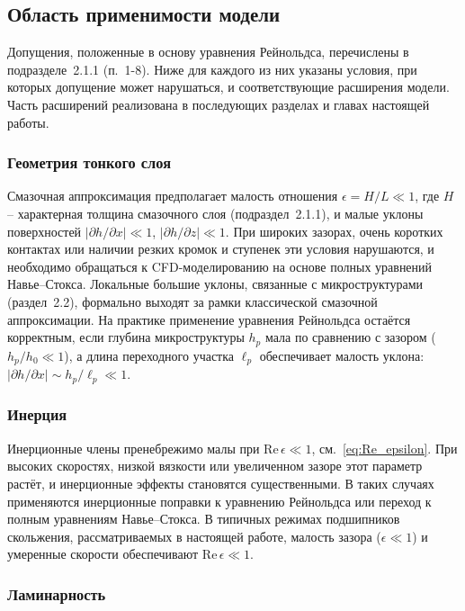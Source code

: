 \subsection{Область применимости модели}

Допущения, положенные в основу уравнения Рейнольдса, перечислены в подразделе~2.1.1 (п.~1-8). Ниже для каждого из них указаны условия, при которых допущение может нарушаться, и соответствующие расширения модели. Часть расширений реализована в последующих разделах и главах настоящей работы.

\subsubsection*{Геометрия тонкого слоя}

Смазочная аппроксимация предполагает малость отношения $\epsilon = H/L \ll 1$, где $H$ -- характерная толщина смазочного слоя (подраздел~2.1.1), и малые уклоны поверхностей $|\partial h/\partial x| \ll 1$, $|\partial h/\partial z| \ll 1$. При широких зазорах, очень коротких контактах или наличии резких кромок и ступенек эти условия нарушаются, и необходимо обращаться к CFD-моделированию на основе полных уравнений Навье--Стокса. Локальные большие уклоны, связанные с микроструктурами (раздел~2.2), формально выходят за рамки классической смазочной аппроксимации. На практике применение уравнения Рейнольдса остаётся корректным, если глубина микроструктуры $h_p$ мала по сравнению с зазором ($h_p / h_0 \ll 1$), а длина переходного участка $\ell_p$ обеспечивает малость уклона: $|\partial h/\partial x| \sim h_p/\ell_p \ll 1$.

\subsubsection*{Инерция}

Инерционные члены пренебрежимо малы при $\mathrm{Re}\,\epsilon \ll 1$, см.~\eqref{eq:Re_epsilon}. При высоких скоростях, низкой вязкости или увеличенном зазоре этот параметр растёт, и инерционные эффекты становятся существенными. В таких случаях применяются инерционные поправки к уравнению Рейнольдса или переход к полным уравнениям Навье--Стокса. В типичных режимах подшипников скольжения, рассматриваемых в настоящей работе, малость зазора ($\epsilon \ll 1$) и умеренные скорости обеспечивают $\mathrm{Re}\,\epsilon \ll 1$.

\subsubsection*{Ламинарность}

